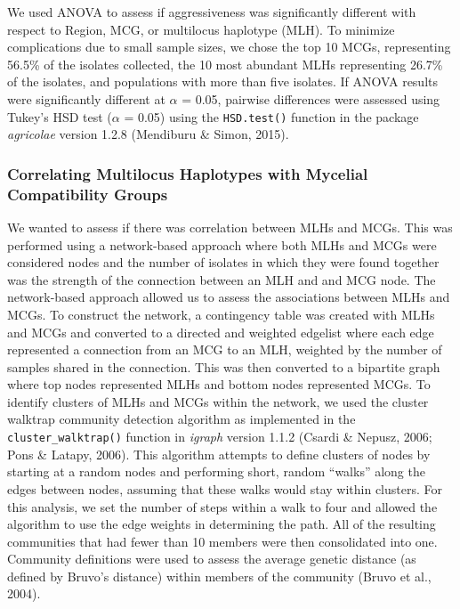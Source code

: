 \documentclass[fleqn,10pt,lineno]{wlpeerj} %
\theoremstyle{definition}
\theoremstyle{definition}
\theoremstyle{definition}
\theoremstyle{remark}
\begin{document}
We used ANOVA to assess if aggressiveness was significantly different
with respect to Region, MCG, or multilocus haplotype (MLH). To minimize
complications due to small sample sizes, we chose the top 10 MCGs,
representing 56.5\% of the isolates collected, the 10 most abundant MLHs
representing 26.7\% of the isolates, and populations with more than five
isolates. If ANOVA results were significantly different at \(\alpha\) =
0.05, pairwise differences were assessed using Tukey's HSD test
(\(\alpha\) = 0.05) using the \texttt{HSD.test()} function in the
package \emph{agricolae} version 1.2.8 (Mendiburu \& Simon, 2015).

\subsubsection*{Correlating Multilocus Haplotypes with Mycelial
Compatibility
Groups}\label{correlating-multilocus-haplotypes-with-mycelial-compatibility-groups}

We wanted to assess if there was correlation between MLHs and MCGs. This
was performed using a network-based approach where both MLHs and MCGs
were considered nodes and the number of isolates in which they were
found together was the strength of the connection between an MLH and and
MCG node. The network-based approach allowed us to assess the
associations between MLHs and MCGs. To construct the network, a
contingency table was created with MLHs and MCGs and converted to a
directed and weighted edgelist where each edge represented a connection
from an MCG to an MLH, weighted by the number of samples shared in the
connection. This was then converted to a bipartite graph where top nodes
represented MLHs and bottom nodes represented MCGs. To identify clusters
of MLHs and MCGs within the network, we used the cluster walktrap
community detection algorithm as implemented in the
\texttt{cluster\_walktrap()} function in \emph{igraph} version 1.1.2
(Csardi \& Nepusz, 2006; Pons \& Latapy, 2006). This algorithm attempts
to define clusters of nodes by starting at a random nodes and performing
short, random ``walks'' along the edges between nodes, assuming that
these walks would stay within clusters. For this analysis, we set the
number of steps within a walk to four and allowed the algorithm to use
the edge weights in determining the path. All of the resulting
communities that had fewer than 10 members were then consolidated into
one. Community definitions were used to assess the average genetic
distance (as defined by Bruvo's distance) within members of the
community (Bruvo et al., 2004).
\end{document}

